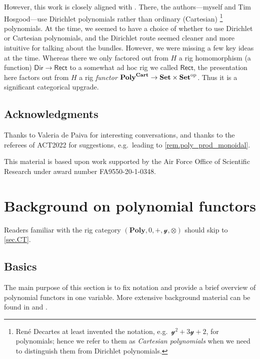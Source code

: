 \documentclass[11pt, one side, article]{memoir}
\theoremstyle{definition}
\theoremstyle{plain}
\newcommand{\Set}[1]{\mathsf{#1}}%
\newcommand{\Cat}[1]{\mathbf{#1}}%
\newcommand{\op}{^\tn{op}}
\newcommand{\tn}[1]{\textnormal{#1}}
\newcommand{\smset}{\Cat{Set}}
\newcommand{\yon}{\mathcal{y}}
\newcommand{\poly}{\Cat{Poly}}
\newcommand{\dir}{\Set{Dir}}
\newcommand{\rect}{\Set{Rect}}
\newcommand{\polycart}{\poly^{\Cat{Cart}}}
\newcommand{\0}{\textsf{0}}
\newcommand{\1}{\tn{\textsf{1}}}
\begin{document}
However, this work is closely aligned with \cite{spivak2021dirichlet}. There, the authors---myself and Tim Hosgood---use Dirichlet polynomials rather than ordinary (Cartesian)%
\footnote{Ren\'{e} Decartes at least invented the notation, e.g.\ $\yon^2+3\yon+2$, for polynomials; hence we refer to them as \emph{Cartesian polynomials} when we need to distinguish them from Dirichlet polynomials.}
polynomials. At the time, we seemed to have a choice of whether to use Dirichlet or Cartesian polynomials, and the Dirichlet route seemed cleaner and more intuitive for talking about the bundles. However, we were missing a few key ideas at the time. Whereas there we only factored out from $H$ a rig homomorphism (a function) $\dir\to\rect$ to a somewhat ad hoc rig we called $\rect$, the presentation here factors out from $H$ a rig \emph{functor} $\polycart\to\smset\times\smset\op$. Thus it is a significant categorical upgrade.

\section*{Acknowledgments}
Thanks to Valeria de Paiva for interesting conversations, and thanks to the referees of ACT2022 for suggestions, e.g.\ leading to \cref{rem.poly_prod_monoidal}.

This material is based upon work supported by the Air Force Office of Scientific Research under award number FA9550-20-1-0348.

\chapter{Background on polynomial functors}\label{chap.background}

Readers familiar with the rig category $(\poly,0,+,\yon,\otimes)$ should skip to \cref{sec.CT}.

\section{Basics}


The main purpose of this section is to fix notation and provide a brief overview of polynomial functors in one variable. More extensive background material can be found in \cite{spivak2022poly} and \cite{kock2012polynomial}. 
\end{document}
